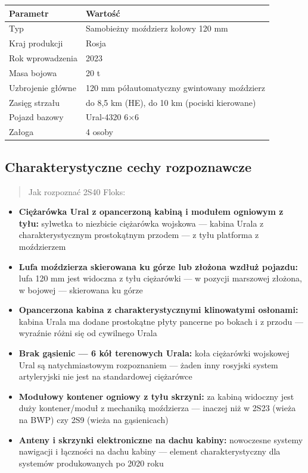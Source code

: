 \documentclass[12pt,oneside]{book}
\providecommand{\tightlist}{%
  \setlength{\itemsep}{0pt}\setlength{\parskip}{0pt}}
\begin{document}
\begin{longtable}[]{@{}ll@{}}
\toprule\noalign{}
Parametr & Wartość \\
\midrule\noalign{}
\endhead
\bottomrule\noalign{}
\endlastfoot
Typ & Samobieżny moździerz kołowy 120 mm \\
Kraj produkcji & Rosja \\
Rok wprowadzenia & 2023 \\
Masa bojowa & 20 t \\
Uzbrojenie główne & 120 mm półautomatyczny gwintowany moździerz \\
Zasięg strzału & do 8,5 km (HE), do 10 km (pociski kierowane) \\
Pojazd bazowy & Ural-4320 6×6 \\
Załoga & 4 osoby \\
\end{longtable}

\subsection{Charakterystyczne cechy
rozpoznawcze}\label{charakterystyczne-cechy-rozpoznawcze-25}

\begin{quote}
Jak rozpoznać 2S40 Floks:
\end{quote}

\begin{itemize}
\tightlist
\item
  \textbf{Ciężarówka Ural z opancerzoną kabiną i modułem ogniowym z
  tyłu:} sylwetka to niezbicie ciężarówka wojskowa --- kabina Urala z
  charakterystycznym prostokątnym przodem --- z tyłu platforma z
  moździerzem
\item
  \textbf{Lufa moździerza skierowana ku górze lub złożona wzdłuż
  pojazdu:} lufa 120 mm jest widoczna z tyłu ciężarówki --- w pozycji
  marszowej złożona, w bojowej --- skierowana ku górze
\item
  \textbf{Opancerzona kabina z charakterystycznymi klinowatymi
  osłonami:} kabina Urala ma dodane prostokątne płyty pancerne po bokach
  i z przodu --- wyraźnie różni się od cywilnego Urala
\item
  \textbf{Brak gąsienic --- 6 kół terenowych Urala:} koła ciężarówki
  wojskowej Ural są natychmiastowym rozpoznaniem --- żaden inny rosyjski
  system artyleryjski nie jest na standardowej ciężarówce
\item
  \textbf{Modułowy kontener ogniowy z tyłu skrzyni:} za kabiną widoczny
  jest duży kontener/moduł z mechaniką moździerza --- inaczej niż w 2S23
  (wieża na BWP) czy 2S9 (wieża na gąsienicach)
\item
  \textbf{Anteny i skrzynki elektroniczne na dachu kabiny:} nowoczesne
  systemy nawigacji i łączności na dachu kabiny --- element
  charakterystyczny dla systemów produkowanych po 2020 roku
\end{itemize}
\end{document}
